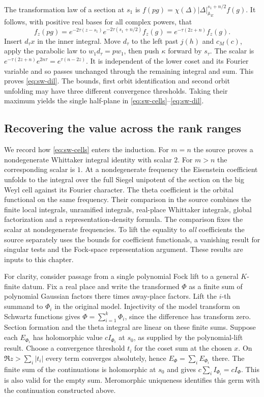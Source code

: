 The transformation law of a section at \(s_1\)
is \(f(pg)=\chi(\Delta)|\Delta|_{\mathbb A_E}^{s_1+n/2}f(g)\).
It follows, with positive real bases for all complex powers, that
\[
 f_z(pg)=
 e^{-2\tau(z-s_1)} e^{-2\tau(s_1+n/2)} f_z(g)
          =e^{-\tau(2z+n)}f_z(g).
\]
Insert \(d_\tau x\) in the inner integral. Move \(d_\tau\) to the
left past \(j(h)\) and \(c_M(c)\), apply the parabolic law to
\(w_1d_\tau=pw_1\), then push \(\kappa\) forward by \(s_\tau\).
The scalar is \(e^{-\tau(2z+n)}e^{2n\tau}=e^{\tau(n-2z)}\).
It is independent of the lower coset and its Fourier variable and
so passes unchanged through the remaining integral and sum. This
proves \eqref{eq:sw-dil}. The bounds, first orbit identification
and second orbit unfolding may have three different convergence
thresholds. Taking their maximum yields the single half-plane in
\eqref{eq:sw-cells}--\eqref{eq:sw-dil}.

\subsection{Recovering the value across the rank ranges}

We record how \eqref{eq:sw-cells} enters the induction. For
\(m=n\) the source proves a nondegenerate Whittaker integral
identity with scalar \(2\). For \(m>n\) the corresponding scalar
is \(1\). At a nondegenerate frequency the Eisenstein coefficient
unfolds to the integral over the full Siegel unipotent of the
section on the big Weyl cell against its Fourier character.
The theta coefficient is the orbital functional on the same
frequency. Their comparison in the source combines the finite
local integrals, unramified integrals, real-place Whittaker
integrals, global factorization and a representation-density
formula. The comparison fixes the scalar at nondegenerate
frequencies. To lift the equality to \emph{all} coefficients the
source separately uses the bounds for coefficient functionals,
a vanishing result for singular tests and the Fock-space
representation argument. These results are inputs to this chapter.

For clarity, consider passage from a single polynomial Fock lift
to a general \(K\)-finite datum. Fix a real place and write the
transformed \(\Phi\) as a finite sum of polynomial Gaussian factors
there times away-place factors. Lift the \(i\)-th summand to
\(\Phi_i\) in the original model. Injectivity of the model
transform on Schwartz functions gives
\(\Phi=\sum_{i=1}^k\Phi_i\), since the difference has transform
zero. Section formation and the theta integral are linear on
these finite sums. Suppose each \(E_{\Phi_i}\) has holomorphic
value \(cI_{\Phi_i}\) at \(s_0\), as supplied by the
polynomial-lift result. Choose a convergence threshold \(t_i\)
for the coset sum at the chosen \(x\). On
\(\Re z>\sum_i|t_i|\) every term converges absolutely, hence
\(E_\Phi=\sum_i E_{\Phi_i}\) there. The finite sum of the
continuations is holomorphic at \(s_0\) and gives
\(c\sum_i I_{\Phi_i}=cI_\Phi\). This is also valid for the empty
sum. Meromorphic uniqueness identifies this germ with the
continuation constructed above.

